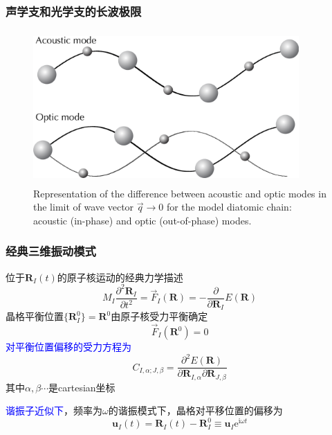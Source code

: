 {\frame
{
	\frametitle{声学支和光学支的长波极限}
\begin{figure}[h!]
\centering
\vspace*{-0.10in}
\includegraphics[height=2.3in,width=4.0in,viewport=0 0 1210 650,clip]{Figures/Phonon-Acoutic-Optic.png}
\caption{\tiny \textrm{Representation of the difference between acoustic and optic modes in the limit of wave vector $\vec q\rightarrow0$ for the model diatomic chain: acoustic (in-phase) and optic (out-of-phase) modes.}}%
\label{Aucous-Optic}
\end{figure} 
}

\frame
{
	\frametitle{经典三维振动模式}
	位于$\mathbf{R}_I(t)$的原子核运动的经典力学描述
			\begin{displaymath}
				M_I\frac{\partial^2\mathbf{R}_I}{\partial t^2}=\vec F_I(\mathbf{R})=-\frac{\partial}{\partial\mathbf{R}_I}E(\mathbf{R})
			\end{displaymath}
			晶格平衡位置$\{\mathbf{R}_I^0\}=\mathbf R^0$由原子核受力平衡确定
			\begin{displaymath}
				\vec F_I(\mathbf R^0)=0
			\end{displaymath}
			\textcolor{blue}{对平衡位置偏移的受力方程为}
			\begin{displaymath}
				C_{I,\alpha;J,\beta}=\frac{\partial^2E(\mathbf{R})}{\partial\mathbf{R}_{I,\alpha}\partial\mathbf{R}_{J,\beta}}
			\end{displaymath}
			其中$\alpha,\beta\cdots$是\textrm{cartesian}坐标

			\textcolor{blue}{谐振子近似下}，频率为$\omega$的谐振模式下，晶格对平移位置的偏移为
			\begin{displaymath}
				\mathbf{u}_I(t)=\mathbf{R}_I(t)-\mathbf{R}_I^0\equiv\mathbf{u}_I\mathrm{e}^{\mathrm{i}\omega t}
			\end{displaymath}
}

}

